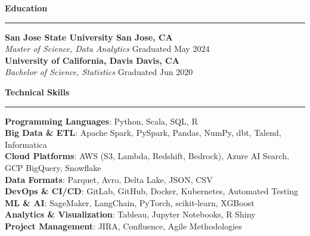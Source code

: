 \documentclass[letterpaper,10pt]{article}
\newcommand{\resumesection}[1]{
  \vspace{4pt}
  \noindent\textbf{\Large #1} \\
  \noindent\rule{\linewidth}{0.2pt}
  \vspace{-4pt}
}
\begin{document}
\resumesection{Education}

\textbf{San Jose State University \hfill San Jose, CA} \\
\textit{Master of Science, Data Analytics} \hfill Graduated May 2024 \\

\textbf{University of California, Davis \hfill Davis, CA} \\
\textit{Bachelor of Science, Statistics} \hfill Graduated Jun 2020

\resumesection{Technical Skills}

\begin{itemize}[leftmargin=0.15in, label={}, itemsep=0pt, parsep=0pt, topsep=0pt]
    \small{\item{
    \textbf{Programming Languages}{: Python, Scala, SQL, R} \\
    \textbf{Big Data \& ETL}{: Apache Spark, PySpark, Pandas, NumPy, dbt, Talend, Informatica} \\
    \textbf{Cloud Platforms}{: AWS (S3, Lambda, Redshift, Bedrock), Azure AI Search, GCP BigQuery, Snowflake} \\
    \textbf{Data Formats}{: Parquet, Avro, Delta Lake, JSON, CSV} \\
    \textbf{DevOps \& CI/CD}{: GitLab, GitHub, Docker, Kubernetes, Automated Testing} \\
    \textbf{ML \& AI}{: SageMaker, LangChain, PyTorch, scikit-learn, XGBoost} \\
    \textbf{Analytics \& Visualization}{: Tableau, Jupyter Notebooks, R Shiny} \\
    \textbf{Project Management}{: JIRA, Confluence, Agile Methodologies}
    }}
\end{itemize}
\end{document}

